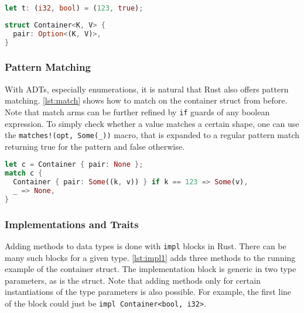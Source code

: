 \noindent\begin{minipage}[t]{.45\textwidth}
\begin{lstlisting}[language=Rust, style=short, caption={A two-tuple in Rust.}, label=lst:tuples]
let t: (i32, bool) = (123, true);
\end{lstlisting}
\end{minipage}\hfill
\begin{minipage}[t]{.45\textwidth}
\begin{lstlisting}[language=Rust, style=short, label={lst:container}, caption={The struct for the running example.}]
struct Container<K, V> {
  pair: Option<(K, V)>,
}
\end{lstlisting}
\end{minipage}

\subsubsection{Pattern Matching}

With ADTs, especially enumerations, it is natural that Rust also offers pattern
matching. \autoref{lst:match} shows how to match on the container struct from
before. Note that match arms can be further refined by \lstinline!if! guards of
any boolean expression. To simply check whether a value matches a certain shape,
one can use the \lstinline"matches!(opt, Some(_))" macro, that is expanded to a
regular pattern match returning true for the pattern  and false otherwise.

\begin{lstlisting}[language=Rust, caption={Pattern matching on a struct.}, label=lst:match]
let c = Container { pair: None };
match c {
  Container { pair: Some((k, v)) } if k == 123 => Some(v),
  _ => None,
}
\end{lstlisting}

\subsubsection{Implementations and Traits}

Adding methods to data types is done with \lstinline!impl! blocks in Rust. There
can be many such blocks for a given type. \autoref{lst:impl1} adds three methods
to the running example of the container struct. The implementation block is
generic in two type parameters, as is the struct. Note that adding methods only
for certain instantiations of the  type parameters is also possible. For
example, the first line of the block could just be \passthrough{\lstinline!impl
Container<bool, i32>!}.

